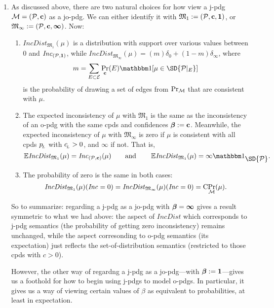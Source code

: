 \documentclass{article}
\newcommand\IncD{\mathit{IncDist}}
\begin{document}
\begin{enumerate}
    \item As discussed above, there are two natural choices for how view a j-pdg $\mathcal M = (\mathcal P, \mathbf{c})$ as a jo-pdg. We can either identify it with $\mathfrak M_1 := (\mathcal P, \mathbf{c}, \mathbf{1})$, or $\mathfrak M_\infty := (\mathcal P, \mathbf{c}, \boldsymbol\infty)$. 
    Now:
    \begin{enumerate}
        \item  $\IncD_{\mathfrak M_1}(\mu)$ is a distribution with support over various values between $0$ and $\mathit{Inc}_{(\mathcal P, \mathbf{1})}$, while
            $\IncD_{\mathfrak M_\infty}(\mu) = (m) \delta_0 + (1-m) \delta_\infty$,
            where 
            \[
            m = \sum_{E \subset \Ed} \Pr_{\mat c}(E) \mathbbm1[ \mu \in \SD{\mathcal P|_E}]
            \]
            is the probability of drawing a set of edges from 
            $\Pr_{\cal M}$
            that are consistent with $\mu$. 
            
        \item The expected inconsistency of $\mu$ with $\mathfrak M_1$ is the same as the inconsistency of an o-pdg with the same cpds and confidences $\boldsymbol\beta := \mathbf{c}$.
        Meanwhile, the expected inconsistency of $\mu$ with $\mathfrak M_\infty$ is zero if $\mu$ is consistent with all cpds $p_{\!_{L}}$ with $c_{\!_{L}}> 0$, and $\infty$ if not.  That is, 
        \[
            \Ex\!\IncD_{\mathfrak M_1}(\mu) = \Inc_{(\mathcal P, \mat c)}(\mu)
                \qquad \text{and}\qquad
            \Ex\!\IncD_{\mathfrak M_1}(\mu) = \infty \mathbbm1_{\textstyle\SD{\mathcal P}}.
        \]
        \item The probability of zero is the same in both cases:
        \[
            \IncD_{\mathfrak M_1}(\mu)(\Inc=0)
            = \IncD_{\mathfrak M_\infty}(\mu)(\Inc = 0)
            = \mathrm{C}\!\Pr_{\cal M}(\mu).
        \]
    \end{enumerate}
    So to summarize: regarding a j-pdg as a jo-pdg with $\boldsymbol\beta = \boldsymbol\infty$ gives a result symmetric to what we had above: the aspect of $\IncD$ which corresponds to j-pdg semantics (the probability of getting zero inconsistency) remains unchanged, while the aspect corresonding to o-pdg semantics (its expectation) just reflects the set-of-distribution semantics (restricted to those cpds with $c > 0$).
    
    However, the other way of regardng a j-pdg as a jo-pdg---with $\boldsymbol\beta := \mathbf{1}$---gives us a foothold for how to begin using j-pdgs to model o-pdgs.
    In particular, it gives us a way of viewing certain values of $\beta$ as equivalent to probabilities, at least in expectation.
\end{enumerate}
\end{document}

